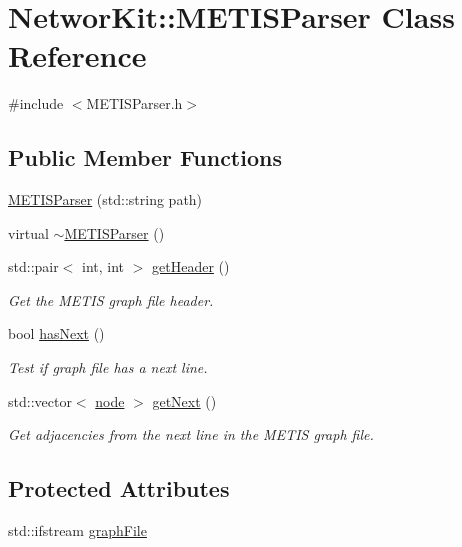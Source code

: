 \hypertarget{class_networ_kit_1_1_m_e_t_i_s_parser}{\section{Networ\-Kit\-:\-:M\-E\-T\-I\-S\-Parser Class Reference}
\label{class_networ_kit_1_1_m_e_t_i_s_parser}
}


{\ttfamily \#include $<$M\-E\-T\-I\-S\-Parser.\-h$>$}

\subsection*{Public Member Functions}
\begin{DoxyCompactItemize}
\item 
\hyperlink{class_networ_kit_1_1_m_e_t_i_s_parser_a62ac589d8023e184e3bd055738a96f28}{M\-E\-T\-I\-S\-Parser} (std\-::string path)
\item 
virtual \hyperlink{class_networ_kit_1_1_m_e_t_i_s_parser_ae6be699914a8acc8bf720775c6244771}{$\sim$\-M\-E\-T\-I\-S\-Parser} ()
\item 
std\-::pair$<$ int, int $>$ \hyperlink{class_networ_kit_1_1_m_e_t_i_s_parser_adb1b00b5e7a3fbba35224b67b9c4d08c}{get\-Header} ()
\begin{DoxyCompactList}\small\item\em Get the M\-E\-T\-I\-S graph file header. \end{DoxyCompactList}\item 
bool \hyperlink{class_networ_kit_1_1_m_e_t_i_s_parser_a52732b9d2ffdead3f05ac8a7fde62c6a}{has\-Next} ()
\begin{DoxyCompactList}\small\item\em Test if graph file has a next line. \end{DoxyCompactList}\item 
std\-::vector$<$ \hyperlink{namespace_networ_kit_a61914158fd771265be48de9942369160}{node} $>$ \hyperlink{class_networ_kit_1_1_m_e_t_i_s_parser_a9146943a37df8c696623019a877bd09c}{get\-Next} ()
\begin{DoxyCompactList}\small\item\em Get adjacencies from the next line in the M\-E\-T\-I\-S graph file. \end{DoxyCompactList}\end{DoxyCompactItemize}
\subsection*{Protected Attributes}
\begin{DoxyCompactItemize}
\item 
std\-::ifstream \hyperlink{class_networ_kit_1_1_m_e_t_i_s_parser_ad4b045bd37a450efdedb2918023de55c}{graph\-File}
\end{DoxyCompactItemize}


